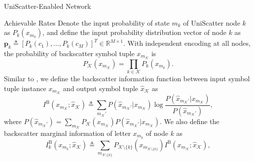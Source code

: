 \documentclass[journal]{IEEEtran}
\begin{document}
\begin{section}{UniScatter-Enabled Network}
	\begin{subsection}{Achievable Rates}
		Denote the input probability of state $m_k$ of UniScatter node $k$ as $P_k(x_{m_k})$, and define the input probability distribution vector of node $k$ as $\boldsymbol{p}_k \triangleq [P_k(c_1),\ldots,P_k(c_M)]^T \in \mathbb{R}^{M \times 1}$. With independent encoding at all nodes, the probability of backscatter symbol tuple $x_{m_{\mathcal{K}}}$ is
		\begin{equation}
			P_{\mathcal{K}}(x_{m_{\mathcal{K}}}) = \prod_{k \in \mathcal{K}} P_k(x_{m_k}).
			\label{eq:equivalent_distribution}
		\end{equation}
		Similar to \cite{Rezaeian2004}, we define the backscatter information function between input symbol tuple instance $x_{m_{\mathcal{K}}}$ and output symbol tuple $\hat{x}_{\mathcal{K}}$ as
		\begin{equation}
			I^{\mathrm{B}}(x_{m_{\mathcal{K}}};\hat{x}_{\mathcal{K}}) \triangleq \sum_{m_{\mathcal{K}}'} P(\hat{x}_{m_{\mathcal{K}}'}|x_{m_{\mathcal{K}}}) \log \frac{P(\hat{x}_{m_{\mathcal{K}}'}|x_{m_{\mathcal{K}}})}{P(\hat{x}_{m_{\mathcal{K}}'})},
			\label{eq:backscatter_information_function}
		\end{equation}
		where $P(\hat{x}_{m_{\mathcal{K}}'}) = \sum_{m_{\mathcal{K}}} P_{\mathcal{K}}(x_{m_{\mathcal{K}}}) P(\hat{x}_{m_{\mathcal{K}}'}|x_{m_{\mathcal{K}}})$.
		We also define the backscatter marginal information of letter $x_{m_k}$ of node $k$ as
		\begin{equation}
			I^{\mathrm{B}}_{k}(x_{m_k};\hat{x}_{\mathcal{K}}) \triangleq \sum_{m_{\mathcal{K} \setminus \{k\}}} P_{\mathcal{K} \setminus \{k\}}(x_{m_{\mathcal{K} \setminus \{k\}}}) I^{\mathrm{B}}(x_{m_{\mathcal{K}}};\hat{x}_{\mathcal{K}}),

\end{equation}
\end{subsection}
\end{section}
\end{document}
